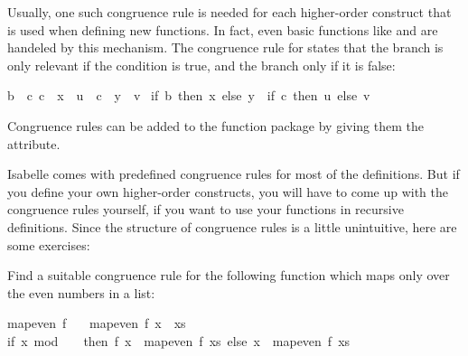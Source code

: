 \begin{isabellebody}
\begin{isamarkuptext}
  Usually, one such congruence rule is
  needed for each higher-order construct that is used when defining
  new functions. In fact, even basic functions like  and  are handeled by this mechanism. The congruence
  rule for  states that the  branch is only
  relevant if the condition is true, and the  branch only if it
  is false:

  \begin{isabelle}%
{\isasymlbrakk}{\isacharquery}b\ {\isacharequal}\ {\isacharquery}c{\isacharsemicolon}\ {\isacharquery}c\ {\isasymLongrightarrow}\ {\isacharquery}x\ {\isacharequal}\ {\isacharquery}u{\isacharsemicolon}\ {\isasymnot}\ {\isacharquery}c\ {\isasymLongrightarrow}\ {\isacharquery}y\ {\isacharequal}\ {\isacharquery}v{\isasymrbrakk}\isanewline
{\isasymLongrightarrow}\ {\isacharparenleft}if\ {\isacharquery}b\ then\ {\isacharquery}x\ else\ {\isacharquery}y{\isacharparenright}\ {\isacharequal}\ {\isacharparenleft}if\ {\isacharquery}c\ then\ {\isacharquery}u\ else\ {\isacharquery}v{\isacharparenright}%
\end{isabelle}
  
  Congruence rules can be added to the
  function package by giving them the  attribute.

  Isabelle comes with predefined congruence rules for most of the
  definitions.
  But if you define your own higher-order constructs, you will have to
  come up with the congruence rules yourself, if you want to use your
  functions in recursive definitions. Since the structure of
  congruence rules is a little unintuitive, here are some exercises:%
\end{isamarkuptext}%
\isamarkuptrue%
%
\begin{isamarkuptext}%
\begin{exercise}
    Find a suitable congruence rule for the following function which
  maps only over the even numbers in a list:

  \begin{isabelle}%
mapeven\ {\isacharquery}f\ {\isacharbrackleft}{\isacharbrackright}\ {\isacharequal}\ {\isacharbrackleft}{\isacharbrackright}\isasep\isanewline%
mapeven\ {\isacharquery}f\ {\isacharparenleft}{\isacharquery}x\ {\isacharhash}\ {\isacharquery}xs{\isacharparenright}\ {\isacharequal}\isanewline
{\isacharparenleft}if\ {\isacharquery}x\ mod\ {}\ {\isacharequal}\ {}\ then\ {\isacharquery}f\ {\isacharquery}x\ {\isacharhash}\ mapeven\ {\isacharquery}f\ {\isacharquery}xs\ else\ {\isacharquery}x\ {\isacharhash}\ mapeven\ {\isacharquery}f\ {\isacharquery}xs{\isacharparenright}%
\end{isabelle}
  \end{exercise}
  

\end{isamarkuptext}
\end{isabellebody}
